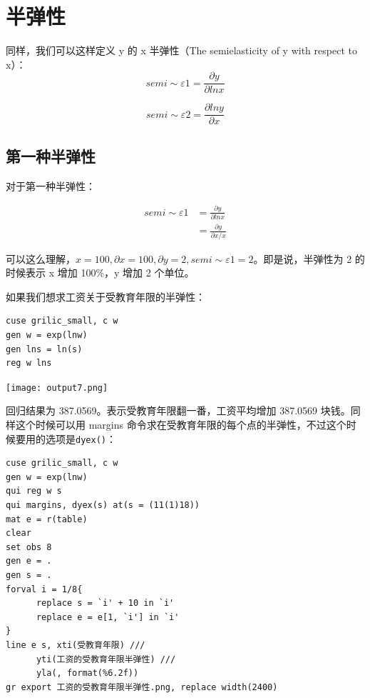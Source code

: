\documentclass[cn,fancy,blue,11pt]{elegantbook}
\begin{document}
\hypertarget{section-25}{%
\section{半弹性}\label{section-25}}

同样，我们可以这样定义 y 的 x 半弹性（The semielasticity of y with respect to x）：
\begin{equation}
  semi\sim\varepsilon 1 = \frac{\partial y}{\partial lnx}
\end{equation}

\begin{equation}
  semi\sim\varepsilon 2 = \frac{\partial lny}{\partial x}
\end{equation}

\hypertarget{section-26}{%
\subsection{第一种半弹性}\label{section-26}}

对于第一种半弹性：

\begin{align}
  semi\sim\varepsilon 1 & = \frac{\partial y}{\partial lnx} \\
  & = \frac{\partial y}{\partial x/x}
\end{align}

可以这么理解，\(x = 100, \partial x = 100, \partial y = 2, semi \sim \varepsilon 1 = 2\)。即是说，半弹性为 2 的时候表示 x 增加 100\%，y 增加 2 个单位。

如果我们想求工资关于受教育年限的半弹性：

\begin{lstlisting}
cuse grilic_small, c w
gen w = exp(lnw)
gen lns = ln(s)
reg w lns
\end{lstlisting}

\noindent\texttt{[image: output7.png]}

回归结果为 387.0569。表示受教育年限翻一番，工资平均增加 387.0569 块钱。同样这个时候可以用 margins 命令求在受教育年限的每个点的半弹性，不过这个时候要用的选项是\lstinline{dyex()}：

\begin{lstlisting}
cuse grilic_small, c w
gen w = exp(lnw)
qui reg w s
qui margins, dyex(s) at(s = (11(1)18))
mat e = r(table)
clear
set obs 8
gen e = .
gen s = .
forval i = 1/8{
      replace s = `i' + 10 in `i'
      replace e = e[1, `i'] in `i'
}
line e s, xti(受教育年限) ///
      yti(工资的受教育年限半弹性) ///
      yla(, format(%6.2f))
gr export 工资的受教育年限半弹性.png, replace width(2400)
\end{lstlisting}
\end{document}
